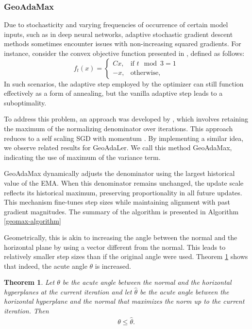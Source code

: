 \documentclass{article}
\newtheorem{theorem}{Theorem}
\begin{document}
\subsubsection{GeoAdaMax}
Due to stochasticity and varying frequencies of occurrence of certain model inputs, such as in deep neural networks, adaptive stochastic gradient descent methods sometimes encounter issues with non-increasing squared gradients. 
 For instance, consider the convex objective function presented in \cite{reddi2019convergence}, defined as follows:
\[
f_t(x) = 
\begin{cases}
    Cx, & \text{if } t \mod 3 = 1\\
    -x, & \text{otherwise},
\end{cases}
\]
In such scenarios, the adaptive step employed by the optimizer can still function effectively as a form of annealing, but the vanilla adaptive step leads to a suboptimality.  

To address this problem, an approach was developed by \cite{reddi2019convergence}, which involves retaining the maximum of the normalizing denominator over iterations. This approach reduces to  a self scaling SGD with momentum
\citep{reddi2019convergence}. By implementing a similar idea, we observe related results for GeoAdaLer.  We call this method GeoAdaMax, indicating the use of maximum of the variance term.

GeoAdaMax dynamically adjusts the denominator using the largest historical value of the EMA. When this denominator remains unchanged, the update scale reflects its historical maximum, preserving proportionality in all future updates. This mechanism fine-tunes step sizes while maintaining alignment with past gradient magnitudes. The summary of the algorithm is presented in Algorithm \ref{geomax-algorithm}

Geometrically, this is akin to increasing the angle between the normal and the horizontal plane by using a vector different from the normal. This leads to relatively smaller step sizes than if the original angle were used. Theorem \ref{geoadamax-theta} shows that indeed, the acute angle $\theta$ is increased.

\begin{theorem}\label{geoadamax-theta}
Let $\theta$ be the acute angle between the normal and the horizontal hyperplanes at the current iteration and let $\hat{\theta}$ be the acute angle between the horizontal hyperplane and the normal that maximizes the norm up to the current iteration. Then
\begin{align*}
    \theta \le \hat{\theta}.
\end{align*}
\end{theorem}
\end{document}
